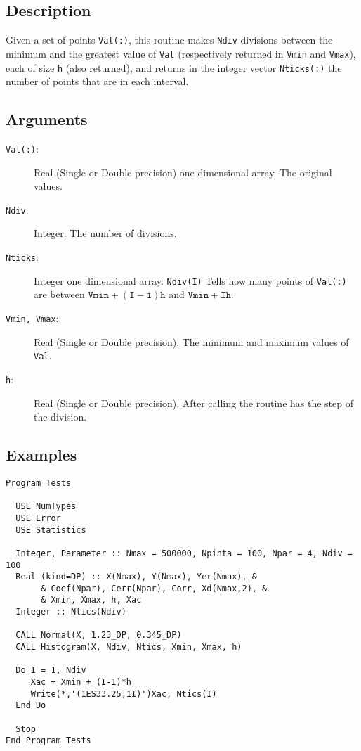 \subsection{Description}

Given a set of points \texttt{Val(:)}, this routine makes
\texttt{Ndiv} divisions between the minimum and the greatest value of
\texttt{Val} (respectively returned in \texttt{Vmin} and
\texttt{Vmax}), each of size \texttt{h} (also returned), and returns
in the integer vector \texttt{Nticks(:)} the number of points that are
in each interval. 

\subsection{Arguments}

\begin{description}
\item[\texttt{Val(:)}:] Real (Single or Double precision) one
  dimensional array. The original values.
\item[\texttt{Ndiv}: ] Integer. The number of divisions.
\item[\texttt{Nticks}:] Integer one dimensional array. \texttt{Ndiv(I)}
  Tells how many points of \texttt{Val(:)} are between
  $\mathtt{Vmin+(I-1)h}$ and $\mathtt{Vmin+Ih}$.
\item[\texttt{Vmin, Vmax}:] Real (Single or Double precision). The
  minimum and maximum values of \texttt{Val}.
\item[\texttt{h}:] Real (Single or Double precision). After calling
  the routine has the step of the division.
\end{description}

\subsection{Examples}

\begin{lstlisting}[emph=Histogram,
                   emphstyle=\color{blue},
                   frame=trBL,
                   caption=Making Histograms.,
                   label=histogram]
Program Tests

  USE NumTypes
  USE Error
  USE Statistics

  Integer, Parameter :: Nmax = 500000, Npinta = 100, Npar = 4, Ndiv = 100
  Real (kind=DP) :: X(Nmax), Y(Nmax), Yer(Nmax), &
       & Coef(Npar), Cerr(Npar), Corr, Xd(Nmax,2), &
       & Xmin, Xmax, h, Xac
  Integer :: Ntics(Ndiv)

  CALL Normal(X, 1.23_DP, 0.345_DP)
  CALL Histogram(X, Ndiv, Ntics, Xmin, Xmax, h)
  
  Do I = 1, Ndiv
     Xac = Xmin + (I-1)*h
     Write(*,'(1ES33.25,1I)')Xac, Ntics(I)
  End Do

  Stop
End Program Tests
\end{lstlisting}

